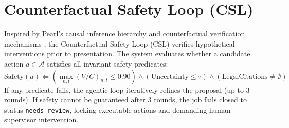 \section{Counterfactual Safety Loop (CSL)}
Inspired by Pearl's causal inference hierarchy \cite{pearl2018why} and counterfactual verification mechanisms \cite{bjoern2021counterfactual}, the Counterfactual Safety Loop (CSL) verifies hypothetical interventions prior to presentation. The system evaluates whether a candidate action $a \in \mathcal{A}$ satisfies all invariant safety predicates:
\begin{equation}
  \text{Safety}(a) \iff \left( \max_{n, t} (V/C)_{n,t} \le 0.90 \right) \land \left( \text{Uncertainty} \le \tau \right) \land \left( \text{LegalCitations} \neq \emptyset \right)
\end{equation}
If any predicate fails, the agentic loop iteratively refines the proposal (up to 3 rounds). If safety cannot be guaranteed after 3 rounds, the job fails closed to status \texttt{needs\_review}, locking executable actions and demanding human supervisor intervention.
